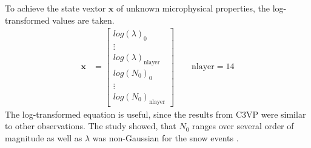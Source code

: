 To achieve the state vextor $\mathbf{x}$ of unknown microphysical properties, the log-transformed values are taken.
\begin{align}
	\mathbf{x} & = \begin{bmatrix}
		log(\lambda)_0 	\\
		\vdots 			\\
		log(\lambda)_{\text{nlayer}} 	\\
		log(N_0)_0		\\
		\vdots			\\
		log(N_0)_{\text{nlayer}}		
	\end{bmatrix} \qquad \text{nlayer} = 14
	\label{eq:snow_prop}
\end{align}
The log-transformed equation is useful, since the results from C3VP were similar to other observations. The study showed, that $N_0$ ranges over several order of magnitude as well as $\lambda$ was non-Gaussian for the snow events \cite{wood_estimation_2011}.



